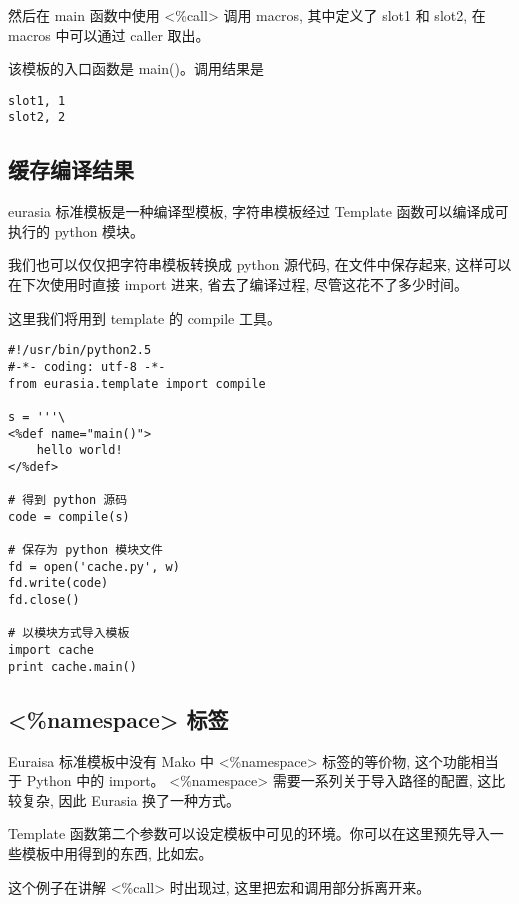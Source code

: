 \documentclass{manual}
\begin{document}
然后在 main 函数中使用 <\%call> 调用 macros, 其中定义了 slot1 和 slot2,
在 macros 中可以通过 caller 取出。

该模板的入口函数是 main()。调用结果是

\begin{verbatim}
slot1, 1
slot2, 2
\end{verbatim}



\subsection{缓存编译结果}

eurasia 标准模板是一种编译型模板, 字符串模板经过 Template 函数可以编译成可执行的 python 模块。

我们也可以仅仅把字符串模板转换成 python 源代码, 在文件中保存起来,
这样可以在下次使用时直接 import 进来, 省去了编译过程, 尽管这花不了多少时间。

这里我们将用到 template 的 compile 工具。

\begin{verbatim}
#!/usr/bin/python2.5
#-*- coding: utf-8 -*-
from eurasia.template import compile

s = '''\
<%def name="main()">
	hello world!
</%def>

# 得到 python 源码
code = compile(s)

# 保存为 python 模块文件
fd = open('cache.py', w)
fd.write(code)
fd.close()

# 以模块方式导入模板
import cache
print cache.main()
\end{verbatim}

\subsection{<\%namespace> 标签}

Euraisa 标准模板中没有 Mako 中 <\%namespace> 标签的等价物, 这个功能相当于 Python 中的 import。
<\%namespace> 需要一系列关于导入路径的配置, 这比较复杂, 因此 Eurasia 换了一种方式。

Template 函数第二个参数可以设定模板中可见的环境。你可以在这里预先导入一些模板中用得到的东西, 比如宏。

这个例子在讲解 <\%call> 时出现过, 这里把宏和调用部分拆离开来。
\end{document}
